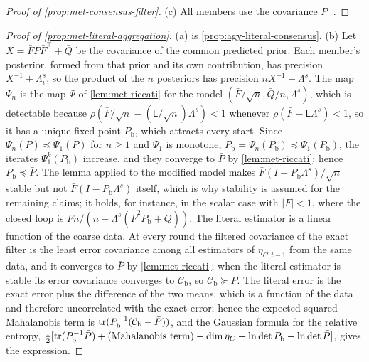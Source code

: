 \begin{proof}[Proof of \cref{prop:met-consensus-filter}]
(c) All members use the covariance $\bar P^-$.
\end{proof}

\begin{proof}[Proof of \cref{prop:met-literal-aggregation}]
(a) is \cref{prop:agy-literal-consensus}. (b) Let $X=\bar FP\bar F^\top+\bar Q$ be the covariance of the common predicted prior. Each member's posterior, formed from that prior and its own contribution, has precision $X^{-1}+\Lambda^s_i$, so the product of the $n$ posteriors has precision $nX^{-1}+\Lambda^s$. The map $\Psi_n$ is the map $\Psi$ of \cref{lem:met-riccati} for the model $(\bar F/\sqrt n,\bar Q/n,\Lambda^s)$, which is detectable because $\rho(\bar F/\sqrt n-(\mathsf L/\sqrt n)\Lambda^s)<1$ whenever $\rho(\bar F-\mathsf L\Lambda^s)<1$, so it has a unique fixed point $P_{\mathrm b}$, which attracts every start. Since $\Psi_n(P)\preceq\Psi_1(P)$ for $n\ge1$ and $\Psi_1$ is monotone, $P_{\mathrm b}=\Psi_n(P_{\mathrm b})\preceq\Psi_1(P_{\mathrm b})$, the iterates $\Psi_1^k(P_{\mathrm b})$ increase, and they converge to $\bar P$ by \cref{lem:met-riccati}; hence $P_{\mathrm b}\preceq\bar P$. The lemma applied to the modified model makes $\bar F(I-P_{\mathrm b}\Lambda^s)/\sqrt n$ stable but not $\bar F(I-P_{\mathrm b}\Lambda^s)$ itself, which is why stability is assumed for the remaining claims; it holds, for instance, in the scalar case with $\lvert\bar F\rvert<1$, where the closed loop is $\bar Fn/(n+\Lambda^s(\bar F^2P_{\mathrm b}+\bar Q))$. The literal estimator is a linear function of the coarse data. At every round the filtered covariance of the exact filter is the least error covariance among all estimators of $\eta_{C,t-1}$ from the same data, and it converges to $\bar P$ by \cref{lem:met-riccati}; when the literal estimator is stable its error covariance converges to $\mathcal C_{\mathrm b}$, so $\mathcal C_{\mathrm b}\succeq\bar P$. The literal error is the exact error plus the difference of the two means, which is a function of the data and therefore uncorrelated with the exact error; hence the expected squared Mahalanobis term is $\operatorname{tr}(P_{\mathrm b}^{-1}(\mathcal C_{\mathrm b}-\bar P))$, and the Gaussian formula for the relative entropy, $\frac12[\operatorname{tr}(P_{\mathrm b}^{-1}\bar P)+(\text{Mahalanobis term})-\dim\eta_C+\ln\det P_{\mathrm b}-\ln\det\bar P]$, gives the expression.
\end{proof}

